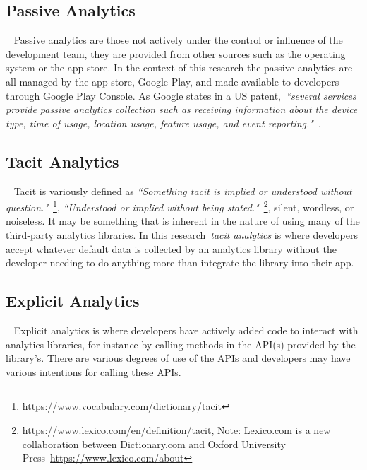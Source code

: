 

\subsection{Passive Analytics}~\label{subsection-passive-analytics}
Passive analytics are those not actively under the control or influence of the development team, they are provided from other sources such as the operating system or the app store. In the context of this research the passive analytics are all managed by the app store, Google Play, and made available to developers through Google Play Console. As Google states in a US patent,~\emph{``several services provide passive analytics collection such as receiving information about the device type, time of usage, location usage, feature usage, and event reporting."}~\cite{googlepatent_hyman2016_collecting_application_usage_analytics}.  


\subsection{Tacit Analytics}~\label{subsection-tacit-analytics}
Tacit is variously defined as \emph{``Something tacit is implied or understood without question."}~\footnote{\url{https://www.vocabulary.com/dictionary/tacit}}, \emph{``Understood or implied without being stated."}~\footnote{\url{https://www.lexico.com/en/definition/tacit}, Note: Lexico.com is a new collaboration between Dictionary.com and Oxford University Press~\url{https://www.lexico.com/about}}, silent, wordless, or noiseless. 
%
It may be something that is inherent in the nature of using many of the third-party analytics libraries. In this research~\emph{tacit analytics} is where developers accept whatever default data is collected by an analytics library without the developer needing to do anything more than integrate the library into their app. 

\subsection{Explicit Analytics}~\label{subsection-explicit-analytics}
Explicit analytics is where developers have actively added code to interact with analytics libraries, for instance by calling methods in the API(s) provided by the library's. There are various degrees of use of the APIs and developers may have various intentions for calling these APIs.

